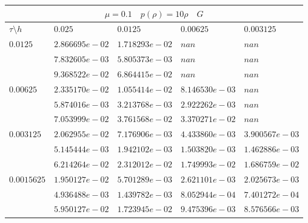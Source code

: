 \documentclass[a4paper,12pt]{extarticle}
\begin{document}
\begin{tabular}{|l|l|l|l|l|}
	\hline
	\multicolumn{5}{|c|}{$\mu =0.1 \quad  p(\rho) =10 \rho \quad G$}\\
	\hline
	$\tau\setminus h$ & $0.025$ & $0.0125$ & $0.00625$ & $0.003125$\\
	\hline
	$0.0125$  & $2.866695e-02$ & $1.718293e-02$ & $nan$ & $nan$\\
	& $7.832605e-03$ & $5.805373e-03$ & $nan$ & $nan$\\
	& $9.368522e-02$ & $6.864415e-02$ & $nan$ & $nan$\\
	\hline
	$0.00625$  & $2.335170e-02$ & $1.055414e-02$ & $8.146530e-03$ & $nan$\\
	& $5.874016e-03$ & $3.213768e-03$ & $2.922262e-03$ & $nan$\\
	& $7.053999e-02$ & $3.761568e-02$ & $3.370271e-02$ & $nan$\\
	\hline
	$0.003125$  & $2.062955e-02$ & $7.176906e-03$ & $4.433860e-03$ & $3.900567e-03$\\
	& $5.145444e-03$ & $1.942102e-03$ & $1.503820e-03$ & $1.462886e-03$\\
	& $6.214264e-02$ & $2.312012e-02$ & $1.749993e-02$ & $1.686759e-02$\\
	\hline
	$0.0015625$  & $1.950127e-02$ & $5.701289e-03$ & $2.621101e-03$ & $2.025673e-03$\\
	& $4.936488e-03$ & $1.439782e-03$ & $8.052944e-04$ & $7.401272e-04$\\
	& $5.950127e-02$ & $1.723945e-02$ & $9.475396e-03$ & $8.576566e-03$\\
	\hline
\end{tabular}
\end{document}

